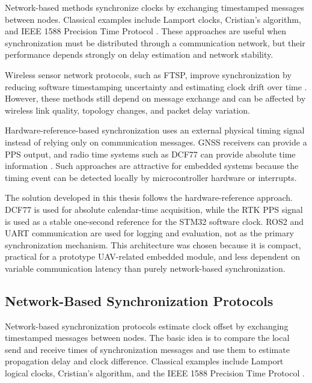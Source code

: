 Network-based methods synchronize clocks by exchanging timestamped messages between nodes. Classical examples include Lamport clocks, Cristian's algorithm, and IEEE 1588 Precision Time Protocol \cite{lamport1978time,cristian1989probabilistic,ieee1588}. These approaches are useful when synchronization must be distributed through a communication network, but their performance depends strongly on delay estimation and network stability.

Wireless sensor network protocols, such as FTSP, improve synchronization by reducing software timestamping uncertainty and estimating clock drift over time \cite{maroti2004ftsp}. However, these methods still depend on message exchange and can be affected by wireless link quality, topology changes, and packet delay variation.

Hardware-reference-based synchronization uses an external physical timing signal instead of relying only on communication messages. GNSS receivers can provide a PPS output, and radio time systems such as DCF77 can provide absolute time information \cite{teunissen2017springer,ptbDcf77}. Such approaches are attractive for embedded systems because the timing event can be detected locally by microcontroller hardware or interrupts.

The solution developed in this thesis follows the hardware-reference approach. DCF77 is used for absolute calendar-time acquisition, while the RTK PPS signal is used as a stable one-second reference for the STM32 software clock. ROS2 and UART communication are used for logging and evaluation, not as the primary synchronization mechanism. This architecture was chosen because it is compact, practical for a prototype UAV-related embedded module, and less dependent on variable communication latency than purely network-based synchronization.

\subsection{Network-Based Synchronization Protocols}

Network-based synchronization protocols estimate clock offset by exchanging timestamped messages between nodes. The basic idea is to compare the local send and receive times of synchronization messages and use them to estimate propagation delay and clock difference. Classical examples include Lamport logical clocks, Cristian's algorithm, and the IEEE 1588 Precision Time Protocol \cite{lamport1978time,cristian1989probabilistic,ieee1588}.

